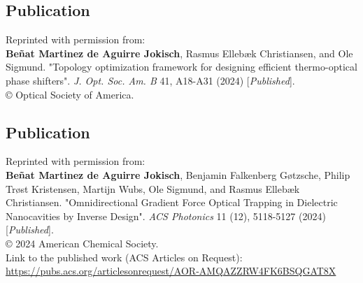 \cleardoublepage
\vspace*{0.4\textheight}
\begin{center}
  \begin{minipage}{0.9\linewidth}
    \section*{Publication \cite{ownpub0}}

    Reprinted with permission from:\\ 

    \textbf{Beñat Martinez de Aguirre Jokisch}, Rasmus Ellebæk Christiansen, and Ole Sigmund. "Topology optimization framework for designing efficient thermo-optical phase shifters". \textit{J. Opt. Soc. Am. B} 41, A18-A31 (2024) [\textit{Published}]. \\
  
    © Optical Society of America.

  \end{minipage}
\end{center}
\newpage

\cleardoublepage
\vspace*{0.4\textheight}
\begin{center}
  \begin{minipage}{0.9\linewidth}
    \section*{Publication \cite{ownpub1}}

    Reprinted with permission from:\\ 

    \textbf{Beñat Martinez de Aguirre Jokisch}, Benjamin Falkenberg Gøtzsche, Philip Trøst Kristensen, Martijn Wubs, Ole Sigmund, and Rasmus Ellebæk Christiansen. "Omnidirectional Gradient Force Optical Trapping in Dielectric Nanocavities by Inverse Design". \textit{ACS Photonics} 11 (12), 5118-5127 (2024) [\textit{Published}]. \\

    © 2024 American Chemical Society.\\

    Link to the published work (ACS Articles on Request):\\
     \url{https://pubs.acs.org/articlesonrequest/AOR-AMQAZZRW4FK6BSQGAT8X}
  \end{minipage}
\end{center}

